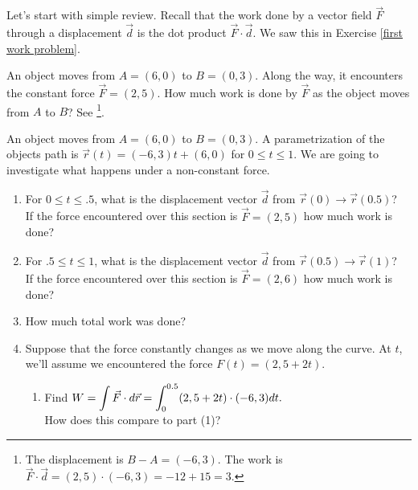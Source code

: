 Let's start with simple review. Recall that the work done by a vector field $\vec F$ through a displacement $\vec d$ is the dot product $\vec F\cdot \vec d$. We saw this in Exercise \ref{first work problem}. 
\begin{review*}
 An object moves from $A=(6,0)$ to $B=(0,3)$. Along the way, it encounters the constant force $\vec F = (2,5)$.  How much work is done by $\vec F$ as the object moves from $A$ to $B$? See \footnote{The displacement is $B-A=(-6,3)$. The work is $\vec F\cdot \vec d = (2,5)\cdot(-6,3) = -12+15=3$.}.
\end{review*}

\begin{problem}
 An object moves from $A=(6,0)$ to $B=(0,3)$. A parametrization of the objects path is $\vec r(t) = (-6,3)t+(6,0)$ for $0\leq t\leq 1$. We are going to investigate what happens under a non-constant force. 
\begin{enumerate}
 \item  For $0\leq t\leq .5$, what is the displacement vector $\vec{d}$ from $\vec{r}(0) \rightarrow \vec{r}(0.5)$?\\
 If the force encountered over this section is $\vec F = (2,5)$ how much work is done?
\item For $.5\leq t\leq 1$, what is the displacement vector $\vec{d}$ from $\vec{r}(0.5) \rightarrow \vec{r}(1)$?\\
 If the force encountered over this section is $\vec F = (2,6)$ how much work is done?
\item How much total work was done?
 \item{}%
Suppose that the force constantly changes as we move along the curve. At $t$, we'll assume we encountered the force $F(t) = (2,5+2t)$. 
\begin{enumerate}[label=\roman*]
\item Find $\displaystyle W=\int \vec F\cdot d\vec r = \int_0^{0.5} (2,5+2t)\cdot (-6,3)dt.$\\ How does this compare to part (1)?

\end{enumerate}
\end{enumerate}
\end{problem}
